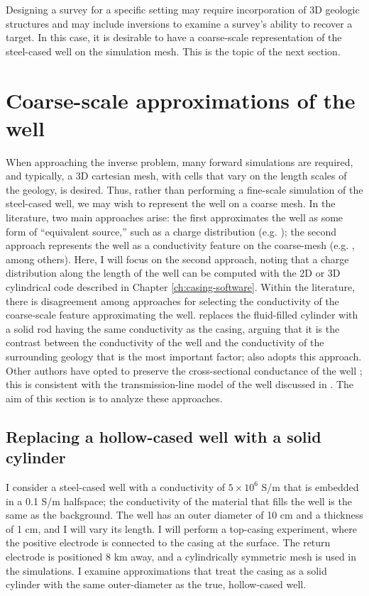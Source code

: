 Designing a survey for a specific setting may require incorporation of 3D geologic structures and may include inversions to examine a survey's ability to recover a target. In this case, it is desirable to have a coarse-scale representation of the steel-cased well on the simulation mesh. This is the topic of the next section.

\section{Coarse-scale approximations of the well}
\label{sec:approximating_wells}

When approaching the inverse problem, many forward simulations are required, and typically, a 3D cartesian mesh, with cells that vary on the length scales of the geology, is desired. Thus, rather than performing a fine-scale simulation of the steel-cased well, we may wish to represent the well on a coarse mesh. In the literature, two main approaches arise: the first approximates the well as some form of ``equivalent source,'' such as a charge distribution (e.g. \cite{Weiss2016}); the second approach represents the well as a conductivity feature on the coarse-mesh (e.g. \cite{Swidinsky2013, Um2015, Yang2016, Kohnke2017, Puzyrev2017}, among others). Here, I will focus on the second approach, noting that a charge distribution along the length of the well can be computed with the 2D or 3D cylindrical code described in Chapter \ref{ch:casing-software}. Within the literature, there is disagreement among approaches for selecting the conductivity of the coarse-scale feature approximating the well. \cite{Um2015} replaces the fluid-filled cylinder with a solid rod having the same conductivity as the casing, arguing that it is the contrast between the conductivity of the well and the conductivity of the surrounding geology that is the most important factor; \cite{Puzyrev2017} also adopts this approach. Other authors have opted to preserve the cross-sectional conductance of the well \citep{Swidinsky2013, Kohnke2017}; this is consistent with the transmission-line model of the well discussed in \cite{Kaufman1990}. The aim of this section is to analyze these approaches.
\subsection{Replacing a hollow-cased well with a solid cylinder}
I consider a steel-cased well with a conductivity of $5\times10^6$ S/m that is embedded in a 0.1 S/m halfspace; the conductivity of the material that fills the well is the same as the background. The well has an outer diameter of 10 cm and a thickness of 1 cm, and I will vary its length. I will perform a top-casing experiment, where the positive electrode is connected to the casing at the surface. The return electrode is positioned 8 km away, and a cylindrically symmetric mesh is used in the simulations. I examine approximations that treat the casing as a solid cylinder with the same outer-diameter as the true, hollow-cased well.

